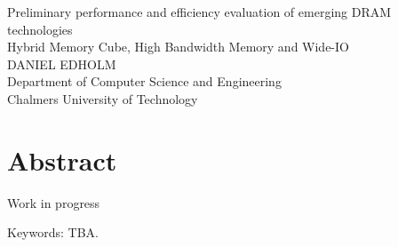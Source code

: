 Preliminary performance and efficiency evaluation of emerging DRAM technologies\\
Hybrid Memory Cube, High Bandwidth Memory and Wide-IO\\
DANIEL EDHOLM\\
Department of Computer Science and Engineering\\
Chalmers University of Technology\\

\thispagestyle{plain}			%
\section*{Abstract}
Work in progress

\vfill
Keywords: TBA.

\newpage				%
\thispagestyle{empty}
\mbox{}